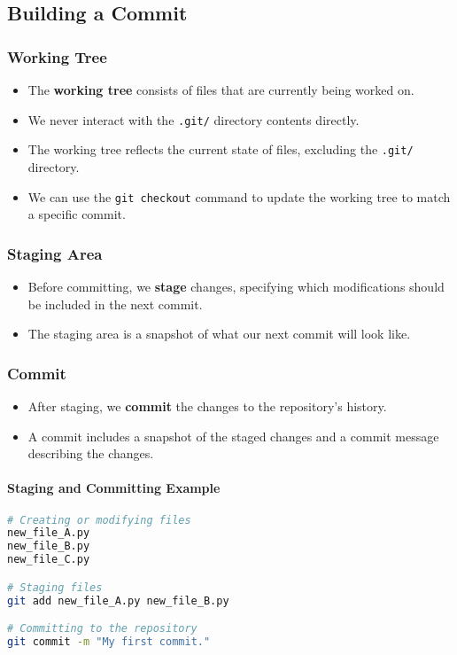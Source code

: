 \documentclass[12pt]{article}
\begin{document}
\subsection{Building a Commit}
\subsubsection{Working Tree}
\begin{itemize}
    \item The \textbf{working tree} consists of files that are currently being worked on.
    \item We never interact with the \texttt{.git/} directory contents directly.
    \item The working tree reflects the current state of files, excluding the \texttt{.git/} directory.
    \item We can use the \texttt{git checkout} command to update the working tree to match a specific commit.
\end{itemize}

\subsubsection{Staging Area}
\begin{itemize}
    \item Before committing, we \textbf{stage} changes, specifying which modifications should be included in the next commit.
    \item The staging area is a snapshot of what our next commit will look like.
\end{itemize}

\subsubsection{Commit}
\begin{itemize}
    \item After staging, we \textbf{commit} the changes to the repository's history.
    \item A commit includes a snapshot of the staged changes and a commit message describing the changes.
\end{itemize}

\paragraph{Staging and Committing Example}
\begin{lstlisting}[language=bash]
# Creating or modifying files
new_file_A.py
new_file_B.py
new_file_C.py

# Staging files
git add new_file_A.py new_file_B.py

# Committing to the repository
git commit -m "My first commit."
\end{lstlisting}
\end{document}
